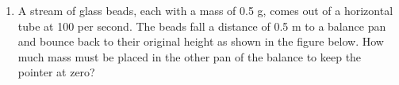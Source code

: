 \documentclass{../../../oss-apphys}
\begin{document}
\begin{enumerate}[leftmargin=15pt]
  
\item A stream of glass beads, each with a mass of 0.5 g, comes out of a
  horizontal tube at 100 per second. The beads fall a distance of 0.5 m to a
  balance pan and bounce back to their original height as shown in the figure
  below. How much mass must be placed in the other pan of the balance to keep
  the pointer at zero?
  \begin{center}
  \end{center}
\end{enumerate}
\end{document}
